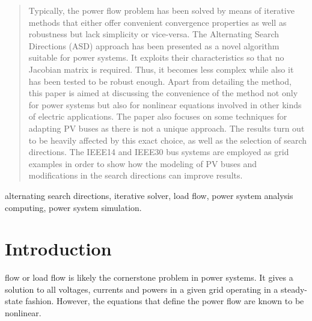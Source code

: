 \documentclass[journal]{IEEEtran}
\begin{document}







\maketitle

\begin{abstract}
Typically, the power flow problem has been solved by means of iterative methods that either offer convenient convergence properties as well as robustness but lack simplicity or vice-versa. The Alternating Search Directions (ASD) approach has been presented as a novel algorithm suitable for power systems. It exploits their characteristics so that no Jacobian matrix is required. Thus, it becomes less complex while also it has been tested to be robust enough. Apart from detailing the method, this paper is aimed at discussing the convenience of the method not only for power systems but also for nonlinear equations involved in other kinds of electric applications. The paper also focuses on some techniques for adapting PV buses as there is not a unique approach. The results turn out to be heavily affected by this exact choice, as well as the selection of search directions. The IEEE14 and IEEE30 bus systems are employed as grid examples in order to show how the modeling of PV buses and modifications in the search directions can improve results. 
\end{abstract}

\begin{IEEEkeywords}
alternating search directions, iterative solver, load flow, power system analysis computing, power system simulation.
\end{IEEEkeywords}

\IEEEpeerreviewmaketitle



\section{Introduction}
 flow or load flow is likely the cornerstone problem in power systems. It gives a solution to all voltages, currents and powers in a given grid operating in a steady-state fashion. However, the equations that define the power flow are known to be nonlinear.
\end{document}
